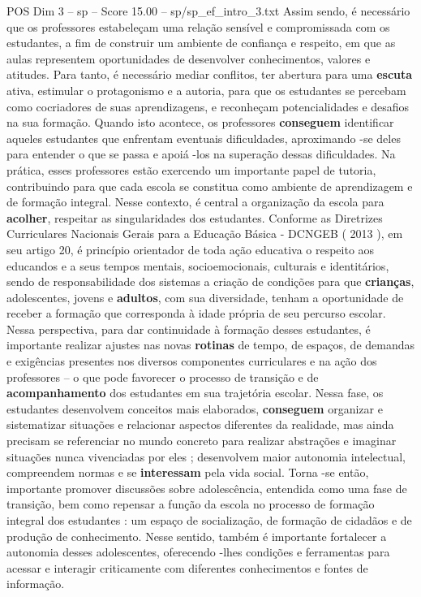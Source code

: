 \begin{textsample}{POS Dim 3 – sp – Score 15.00 – sp/sp\_ef\_intro\_3.txt}
Assim sendo, é necessário que os professores estabeleçam uma relação sensível e compromissada com os estudantes, a fim de construir um ambiente de confiança e respeito, em que as aulas representem oportunidades de desenvolver conhecimentos, valores e atitudes.
Para tanto, é necessário mediar conflitos, ter abertura para uma \textbf{escuta} ativa, estimular o protagonismo e a autoria, para que os estudantes se percebam como cocriadores de suas aprendizagens, e reconheçam potencialidades e desafios na sua formação.
Quando isto acontece, os professores \textbf{conseguem} identificar aqueles estudantes que enfrentam eventuais dificuldades, aproximando -se deles para entender o que se passa e apoiá -los na superação dessas dificuldades.
Na prática, esses professores estão exercendo um importante papel de tutoria, contribuindo para que cada escola se constitua como ambiente de aprendizagem e de formação integral.
Nesse contexto, é central a organização da escola para \textbf{acolher}, respeitar as singularidades dos estudantes.
Conforme as Diretrizes Curriculares Nacionais Gerais para a Educação Básica - DCNGEB ( 2013 ), em seu artigo 20, é princípio orientador de toda ação educativa o respeito aos educandos e a seus tempos mentais, socioemocionais, culturais e identitários, sendo de responsabilidade dos sistemas a criação de condições para que \textbf{crianças}, adolescentes, jovens e \textbf{adultos}, com sua diversidade, tenham a oportunidade de receber a formação que corresponda à idade própria de seu percurso escolar.
Nessa perspectiva, para dar continuidade à formação desses estudantes, é importante realizar ajustes nas novas \textbf{rotinas} de tempo, de espaços, de demandas e exigências presentes nos diversos componentes curriculares e na ação dos professores – o que pode favorecer o processo de transição e de \textbf{acompanhamento} dos estudantes em sua trajetória escolar.
Nessa fase, os estudantes desenvolvem conceitos mais elaborados, \textbf{conseguem} organizar e sistematizar situações e relacionar aspectos diferentes da realidade, mas ainda precisam se referenciar no mundo concreto para realizar abstrações e imaginar situações nunca vivenciadas por eles ; desenvolvem maior autonomia intelectual, compreendem normas e se \textbf{interessam} pela vida social.
Torna -se então, importante promover discussões sobre adolescência, entendida como uma fase de transição, bem como repensar a função da escola no processo de formação integral dos estudantes : um espaço de socialização, de formação de cidadãos e de produção de conhecimento.
Nesse sentido, também é importante fortalecer a autonomia desses adolescentes, oferecendo -lhes condições e ferramentas para acessar e interagir criticamente com diferentes conhecimentos e fontes de informação.

\end{textsample}
